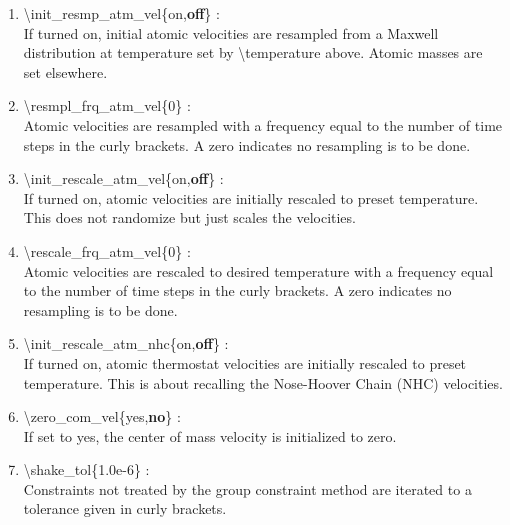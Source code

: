 \documentclass[12pt,titlepage]{article}
\begin{document}
\begin{enumerate}
 \vspace{0.15in}
 \item   \textbackslash init\_resmp\_atm\_vel\{on,{\bf off}\} : \\
     If turned on, initial atomic velocities are resampled from a 
     Maxwell distribution at temperature set by \textbackslash temperature above.
     Atomic masses are set elsewhere.

 \vspace{0.15in}
 \item   \textbackslash resmpl\_frq\_atm\_vel\{0\} : \\
     Atomic velocities are resampled with a frequency equal to the number of time steps
     in the curly brackets.  A zero indicates no resampling is to be done.


 \vspace{0.15in}
 \item   \textbackslash init\_rescale\_atm\_vel\{on,{\bf off}\} : \\
    If turned on, atomic velocities are initially rescaled to preset 
    temperature.   This does not randomize but just scales the velocities.

 \vspace{0.15in}
 \item   \textbackslash rescale\_frq\_atm\_vel\{0\} : \\
    Atomic velocities are rescaled to desired temperature
    with a frequency equal to the number of time steps in the
    curly brackets.  A zero indicates no resampling is to be done.

 \vspace{0.15in} 
 \item   \textbackslash init\_rescale\_atm\_nhc\{on,{\bf off}\} : \\
    If turned on, atomic thermostat velocities are initially rescaled to 
    preset temperature.  This is about recalling the Nose-Hoover Chain (NHC) velocities.

 \vspace{0.15in} 
 \item   \textbackslash zero\_com\_vel\{yes,{\bf no}\} : \\
    If set to yes, the center of mass velocity is initialized to zero.

 \vspace{0.15in} 
 \item   \textbackslash shake\_tol\{1.0e-6\} : \\
     Constraints not treated by the group constraint method are iterated to a
     tolerance given in curly brackets.



\end{enumerate}
\end{document}
